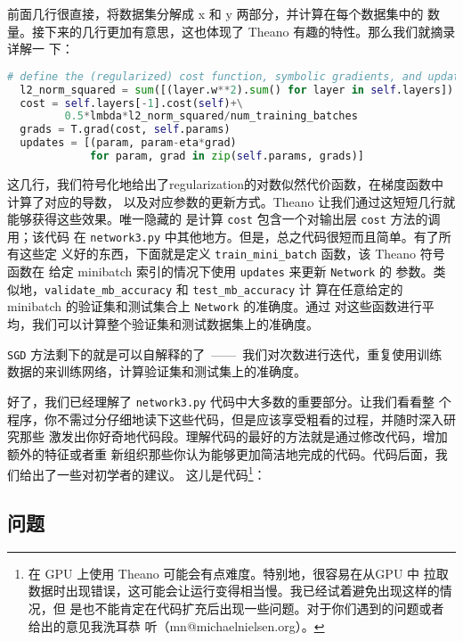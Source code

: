 前面几行很直接，将数据集分解成 x 和 y 两部分，并计算在每个数据集中\minibatch{}的
数量。接下来的几行更加有意思，这也体现了 Theano 有趣的特性。那么我们就摘录详解一
下：

\begin{lstlisting}[language=Python]
  # define the (regularized) cost function, symbolic gradients, and updates
  l2_norm_squared = sum([(layer.w**2).sum() for layer in self.layers])
  cost = self.layers[-1].cost(self)+\
         0.5*lmbda*l2_norm_squared/num_training_batches
  grads = T.grad(cost, self.params)
  updates = [(param, param-eta*grad) 
             for param, grad in zip(self.params, grads)]
\end{lstlisting}

这几行，我们符号化地给出了\gls*{regularization}的对数似然代价函数，在梯度函数中计算了对应的导数，
以及对应参数的更新方式。Theano 让我们通过这短短几行就能够获得这些效果。唯一隐藏的
是计算 \lstinline!cost! 包含一个对输出层 \lstinline!cost! 方法的调用；该代码
在 \lstinline!network3.py! 中其他地方。但是，总之代码很短而且简单。有了所有这些定
义好的东西，下面就是定义 \lstinline!train_mini_batch! 函数，该 Theano 符号函数在
给定 minibatch 索引的情况下使用 \lstinline!updates! 来更新 \lstinline!Network! 的
参数。类似地，\lstinline!validate_mb_accuracy! 和 \lstinline!test_mb_accuracy! 计
算在任意给定的 minibatch 的验证集和测试集合上 \lstinline!Network! 的准确度。通过
对这些函数进行平均，我们可以计算整个验证集和测试数据集上的准确度。

\lstinline!SGD! 方法剩下的就是可以自解释的了~——~我们对次数进行迭代，重复使用训练
数据的\minibatch{}来训练网络，计算验证集和测试集上的准确度。

好了，我们已经理解了 \lstinline!network3.py! 代码中大多数的重要部分。让我们看看整
个程序，你不需过分仔细地读下这些代码，但是应该享受粗看的过程，并随时深入研究那些
激发出你好奇地代码段。理解代码的最好的方法就是通过修改代码，增加额外的特征或者重
新组织那些你认为能够更加简洁地完成的代码。代码后面，我们给出了一些对初学者的建议。
这儿是代码\footnote{在 GPU 上使用 Theano 可能会有点难度。特别地，很容易在从GPU 中
  拉取数据时出现错误，这可能会让运行变得相当慢。我已经试着避免出现这样的情况，但
  是也不能肯定在代码扩充后出现一些问题。对于你们遇到的问题或者给出的意见我洗耳恭
  听（mn@michaelnielsen.org）。}：



\subsection*{问题}

